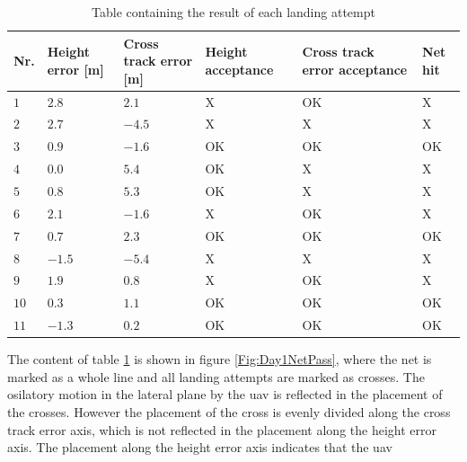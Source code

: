 \begin{table}[H]
\centering
\begin{tabular}{| p{0.5cm} | p{1cm} | p{1cm} | p{3.5cm} | p{3cm} | p{1cm} |}
\hline
\textbf{Nr.}	& \textbf{Height error [m]}	& \textbf{Cross track error [m]}& \textbf{Height acceptance}& \textbf{Cross track error acceptance}	& \textbf{Net hit}\\ \hline
$1$				& $2.8$		& $2.1$		& X								& OK									& X					\\ \hline
$2$				& $2.7$		& $-4.5$	& X								& X										& X					\\ \hline
$3$				& $0.9$		& $-1.6$	& OK							& OK									& OK				\\ \hline
$4$				& $0.0$		& $5.4$		& OK							& X										& X					\\ \hline
$5$				& $0.8$		& $5.3$		& OK							& X										& X					\\ \hline
$6$				& $2.1$		& $-1.6$	& X								& OK									& X					\\ \hline
$7$				& $0.7$		& $2.3$		& OK							& OK									& OK				\\ \hline
$8$				& $-1.5$	& $-5.4$	& X								& X										& X					\\ \hline
$9$				& $1.9$		& $0.8$		& X								& OK									& X					\\ \hline
$10$			& $0.3$	& $1.1$		& OK							& OK									& OK				\\ \hline
$11$			& $-1.3$	& $0.2$		& OK							& OK									& OK				\\ \hline
\end{tabular}
\caption{Table containing the result of each landing attempt}
\label{tb:Day1LandingAttempt}
\end{table}
The content of table \ref{tb:Day1LandingAttempt} is shown in figure \ref{Fig:Day1NetPass}, where the net is marked as a whole line and all landing attempts are marked as crosses. The osilatory motion in the lateral plane by the \gls{uav} is reflected in the placement of the crosses. However the placement of the cross is evenly divided along the cross track error axis, which is not reflected in the placement along the height error axis. The placement along the height error axis indicates that the \gls{uav} 
